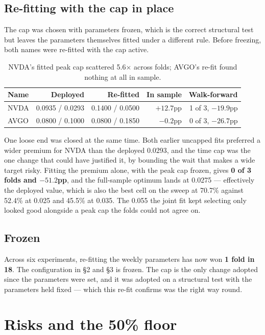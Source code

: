 \documentclass[11pt]{article}
\begin{document}
\subsection{Re-fitting with the cap in place}

The cap was chosen with parameters frozen, which is the correct structural test but leaves the
parameters themselves fitted under a different rule. Before freezing, both names were re-fitted
with the cap active.

\begin{table}[H]\centering\small
\begin{tabular}{lrrrr}
\toprule
\textbf{Name} & \textbf{Deployed} & \textbf{Re-fitted} & \textbf{In sample} &
\textbf{Walk-forward}\\
\midrule
\rowcolor{bckeep} NVDA & 0.0935 / 0.0293 & 0.1400 / 0.0500 & $+12.7$pp & 1 of 3, $-19.9$pp\\
AVGO & 0.0800 / 0.1000 & 0.0800 / 0.1850 & $-0.2$pp & 0 of 3, $-26.7$pp\\
\bottomrule
\end{tabular}
\caption{NVDA's fitted peak cap scattered 5.6$\times$ across folds; AVGO's re-fit found nothing at
all in sample.}
\end{table}

One loose end was closed at the same time. Both earlier uncapped fits preferred a wider premium
for NVDA than the deployed 0.0293, and the time cap was the one change that could have justified
it, by bounding the wait that makes a wide target risky. Fitting the premium alone, with the peak
cap frozen, gives \textbf{0 of 3 folds and $-51.2$pp}, and the full-sample optimum lands at
0.0275 --- effectively the deployed value, which is also the best cell on the sweep at 70.7\%
against 52.4\% at 0.025 and 45.5\% at 0.035. The 0.055 the joint fit kept selecting only looked
good alongside a peak cap the folds could not agree on.

\subsection{Frozen}

Across six experiments, re-fitting the weekly parameters has now won \textbf{1 fold in 18}. The
configuration in \S2 and \S3 is frozen. The cap is the only change adopted since the parameters
were set, and it was adopted on a structural test with the parameters held fixed --- which this
re-fit confirms was the right way round.

\section{Risks and the 50\% floor}
\end{document}

